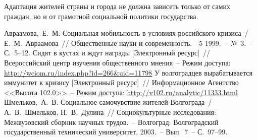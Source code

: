   Адаптация жителей страны и города не должна зависеть только от самих граждан,
  но и от грамотной социальной политики государства.

  \newpage

  \renewcommand{\bibname}{Список литературы}
  \begin{thebibliography}{9}
     Авраамова,~Е.~М. Социальная мобильность в условиях российского
      кризиса~/ Е.~М.~Авраамова~// Общественные науки и современность.~--5
      1999.~-- №~3.~-- С.~5--12.
     Сидят в кустах и ждут награды [Электронный ресурс]~//
      Всероссийский центр изучения общественного мнения~-- Режим доступа:
      \url{http://wciom.ru/index.php?id=266&uid=11798}
     У волгоградцев вырабатывается иммунитет к кризису
      [Электронный ресурс]~// Информационное Агентство <<Высота 102.0>>~--
      Режим доступа: \url{http://v102.ru/analytic/11333.html}
     Шмельков,~А.~В. Социальное самочувствие жителей Волгограда~/
      А.~В.~Шмельков, Н.~В.~Дулина~// Социокультурные исследования:
      Межвузовский сборник научных трудов.~-- Волгоград: Волгоградский
      государственный технический университет, 2003.~-- Вып.~7~-- С.~97--99.
  \end{thebibliography}


